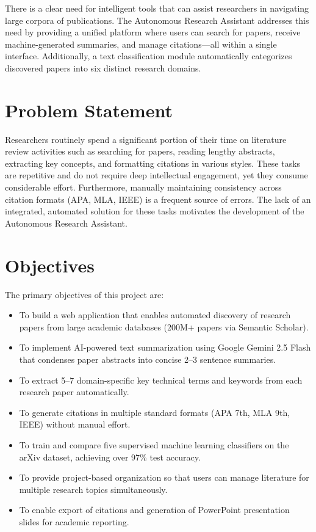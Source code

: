 \documentclass[12pt,a4paper]{article}
\begin{document}
There is a clear need for intelligent tools that can assist researchers in navigating large corpora of publications. The Autonomous Research Assistant addresses this need by providing a unified platform where users can search for papers, receive machine-generated summaries, and manage citations—all within a single interface. Additionally, a text classification module automatically categorizes discovered papers into six distinct research domains.

\section{Problem Statement}

Researchers routinely spend a significant portion of their time on literature review activities such as searching for papers, reading lengthy abstracts, extracting key concepts, and formatting citations in various styles. These tasks are repetitive and do not require deep intellectual engagement, yet they consume considerable effort. Furthermore, manually maintaining consistency across citation formats (APA, MLA, IEEE) is a frequent source of errors. The lack of an integrated, automated solution for these tasks motivates the development of the Autonomous Research Assistant.

\section{Objectives}

The primary objectives of this project are:

\begin{itemize}[leftmargin=1.5cm]
  \item To build a web application that enables automated discovery of research papers from large academic databases (200M+ papers via Semantic Scholar).
  \item To implement AI-powered text summarization using Google Gemini 2.5 Flash that condenses paper abstracts into concise 2--3 sentence summaries.
  \item To extract 5--7 domain-specific key technical terms and keywords from each research paper automatically.
  \item To generate citations in multiple standard formats (APA 7th, MLA 9th, IEEE) without manual effort.
  \item To train and compare five supervised machine learning classifiers on the arXiv dataset, achieving over 97\% test accuracy.
  \item To provide project-based organization so that users can manage literature for multiple research topics simultaneously.
  \item To enable export of citations and generation of PowerPoint presentation slides for academic reporting.
\end{itemize}
\end{document}
